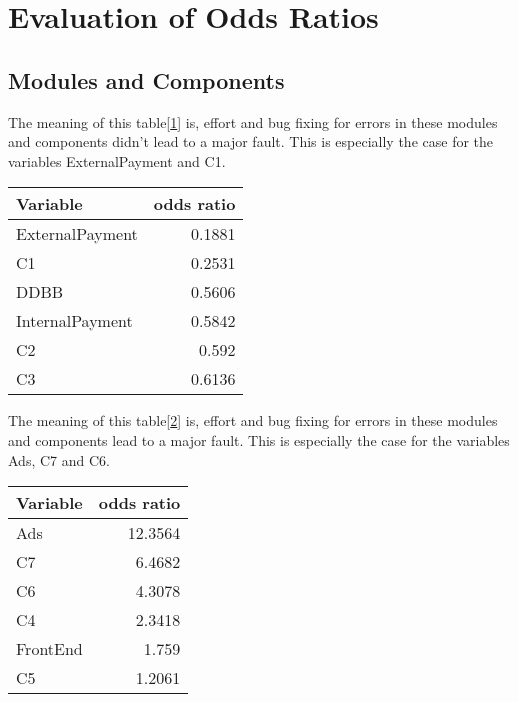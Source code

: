 \section{Evaluation of Odds Ratios}
\subsection{Modules and Components}
The meaning of this table[\ref{table:oddsdec}] is, effort and bug fixing for errors in these modules and components didn't lead to a major fault. This is especially the case for the variables ExternalPayment and C1.
\begin{table}[H]
\centering
\begin{tabular}{ | l | r | }
  \hline
	\textbf{Variable} & \textbf{odds ratio} \\ \hline
  ExternalPayment & 0.1881 \\ \hline
  C1 & 0.2531 \\ \hline
	DDBB & 0.5606 \\ \hline
	InternalPayment & 0.5842 \\ \hline
	C2 & 0.592 \\ \hline
	C3 & 0.6136 \\ \hline
\end{tabular}
\label{table:oddsdec}
\end{table}

The meaning of this table[\ref{table:oddsinc}] is, effort and bug fixing for errors in these modules and components lead to a major fault. This is especially the case for the variables Ads, C7 and C6.
\begin{table}[H]
\centering
\begin{tabular}{ | l | r | }
  \hline
	\textbf{Variable} & \textbf{odds ratio} \\ \hline
  Ads & 12.3564 \\ \hline
	C7 & 6.4682 \\ \hline
	C6 & 4.3078 \\ \hline
	C4 & 2.3418 \\ \hline
	FrontEnd & 1.759 \\ \hline
	C5 & 1.2061 \\ \hline
\end{tabular}
\label{table:oddsinc}
\end{table}

